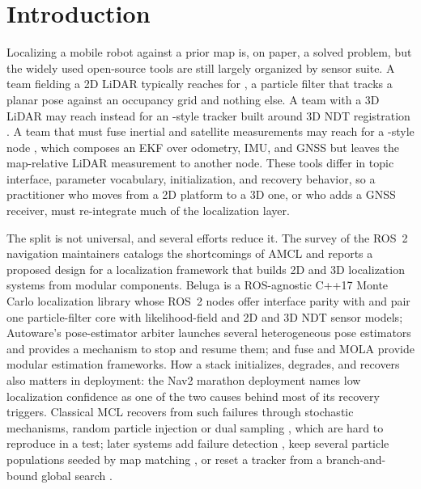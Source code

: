 \section{Introduction}\label{sec:intro}



Localizing a mobile robot against a prior map is, on paper, a solved problem, but the widely used open-source tools are still largely organized by sensor suite. A team fielding a 2D LiDAR typically reaches for , a particle filter that tracks a planar pose against an occupancy grid and nothing else. A team with a 3D LiDAR may reach instead for an -style tracker built around 3D NDT registration \citep{koide2019portable}. A team that must fuse inertial and satellite measurements may reach for a -style node \citep{moore2014generalized}, which composes an EKF over odometry, IMU, and GNSS but leaves the map-relative LiDAR measurement to another node. These tools differ in topic interface, parameter vocabulary, initialization, and recovery behavior, so a practitioner who moves from a 2D platform to a 3D one, or who adds a GNSS receiver, must re-integrate much of the localization layer.

The split is not universal, and several efforts reduce it. The survey of the ROS~2 navigation maintainers \citep{macenski2023survey} catalogs the shortcomings of AMCL and reports a proposed design for a localization framework that builds 2D and 3D localization systems from modular components. Beluga \citep{puga2024beluga,ekumen2022belugarepo} is a ROS-agnostic C++17 Monte Carlo localization library whose ROS~2 nodes offer interface parity with  and pair one particle-filter core with likelihood-field and 2D and 3D NDT sensor models; Autoware's pose-estimator arbiter \citep{autoware2024arbiter} launches several heterogeneous pose estimators and provides a mechanism to stop and resume them; and fuse \citep{locus2018fuse} and MOLA \citep{blancoclaraco2025mola} provide modular estimation frameworks. How a stack initializes, degrades, and recovers also matters in deployment: the Nav2 marathon deployment \citep{macenski2020marathon} names low localization confidence as one of the two causes behind most of its recovery triggers. Classical MCL recovers from such failures through stochastic mechanisms, random particle injection or dual sampling \citep{fox1999efficient,thrun2001robust}, which are hard to reproduce in a test; later systems add failure detection \citep{akai2023reliable}, keep several particle populations seeded by map matching \citep{garcia2023mhamcl}, or reset a tracker from a branch-and-bound global search \citep{koide2021hdlgl,sasaki2026globalloc}.

